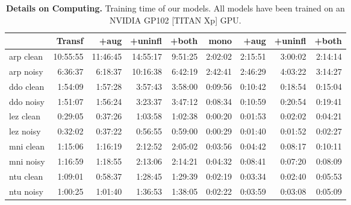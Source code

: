 \begin{table}[h]
\centering
\setlength{\tabcolsep}{3.5pt}
\begin{tabular}{l | rrrr | rrrr }
\hline
\textbf{} & \textbf{Transf} & \textbf{+aug} & \textbf{+uninfl} & \textbf{+both} & \textbf{mono} &  \textbf{+aug} &
      \textbf{+uninfl} &
      \textbf{+both} \\ 
\hline
arp clean & 10:55:55 & 11:46:45 & 14:55:17 & 9:51:25 & 2:02:02 & 2:15:51 & 3:00:02 & 2:14:14 \\

arp noisy & 6:36:37 & 6:18:37 & 10:16:38 & 6:42:19 & 2:42:41 & 2:46:29 & 4:03:22 & 3:14:27 \\
\hline
ddo clean & 1:54:09 & 1:57:28 & 3:57:43 & 3:58:00 & 0:09:56 & 0:10:42 & 0:18:54 & 0:15:04 \\
ddo noisy & 1:51:07 & 1:56:24 & 3:23:37 & 3:47:12 & 0:08:34 & 0:10:59 & 0:20:54 & 0:19:41 \\
\hline
lez clean & 0:29:05 & 0:37:26 & 1:03:58 & 1:02:38 & 0:00:20 & 0:01:53 & 0:02:02 & 0:04:21 \\
lez noisy & 0:32:02 & 0:37:22 & 0:56:55 & 0:59:00 & 0:00:29 & 0:01:40 & 0:01:52 & 0:02:27 \\
\hline
mni clean & 1:15:06 & 1:16:19 & 2:12:52 & 2:05:02 & 0:03:56 & 0:04:42 & 0:08:17 & 0:10:11 \\
mni noisy & 1:16:59 & 1:18:55 & 2:13:06 & 2:14:21 & 0:04:32 & 0:08:41 & 0:07:20 & 0:08:09 \\
\hline
ntu clean & 1:09:01 & 0:58:37 & 1:28:45 & 1:29:39 & 0:02:19 & 0:03:34 & 0:02:40 & 0:05:53 \\
ntu noisy & 1:00:25 & 1:01:40 & 1:36:53 & 1:38:05 & 0:02:22 & 0:03:59 & 0:03:08 & 0:05:09 \\
\hline
\end{tabular}
\caption[Details on IGT2P Computing.]{\textbf{Details on Computing.} Training time of our models. All models have been trained on an NVIDIA GP102 [TITAN Xp] GPU.}
\label{tab:topic_eval}
\end{table}
